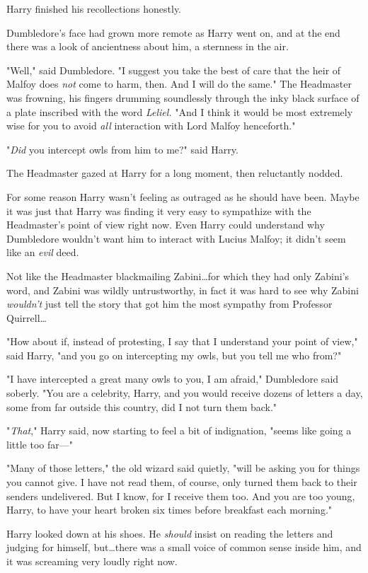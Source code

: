 Harry finished his recollections honestly.

Dumbledore’s face had grown more remote as Harry went on, and at the end there
was a look of ancientness about him, a sternness in the air.

"Well," said Dumbledore. "I suggest you take the best of care that the heir of
Malfoy does \emph{not} come to harm, then. And I will do the same." The
Headmaster was frowning, his fingers drumming soundlessly through the inky
black surface of a plate inscribed with the word \emph{Leliel.} "And I think it
would be most extremely wise for you to avoid \emph{all} interaction with Lord
Malfoy henceforth."

"\emph{Did} you intercept owls from him to me?" said Harry.

The Headmaster gazed at Harry for a long moment, then reluctantly nodded.

For some reason Harry wasn’t feeling as outraged as he should have been. Maybe
it was just that Harry was finding it very easy to sympathize with the
Headmaster’s point of view right now. Even Harry could understand why
Dumbledore wouldn’t want him to interact with Lucius Malfoy; it didn’t seem
like an \emph{evil} deed.

Not like the Headmaster blackmailing Zabini…for which they had only
Zabini’s word, and Zabini was wildly untrustworthy, in fact it was hard to see
why Zabini \emph{wouldn’t} just tell the story that got him the most sympathy
from Professor Quirrell…

"How about if, instead of protesting, I say that I understand your point of
view," said Harry, "and you go on intercepting my owls, but you tell me who
from?"

"I have intercepted a great many owls to you, I am afraid," Dumbledore said
soberly. "You are a celebrity, Harry, and you would receive dozens of letters a
day, some from far outside this country, did I not turn them back."

"\emph{That}," Harry said, now starting to feel a bit of indignation, "seems
like going a little too far—"

"Many of those letters," the old wizard said quietly, "will be asking you for
things you cannot give. I have not read them, of course, only turned them back
to their senders undelivered. But I know, for I receive them too. And you are
too young, Harry, to have your heart broken six times before breakfast each
morning."

Harry looked down at his shoes. He \emph{should} insist on reading the letters
and judging for himself, but…there was a small voice of common sense
inside him, and it was screaming very loudly right now.

